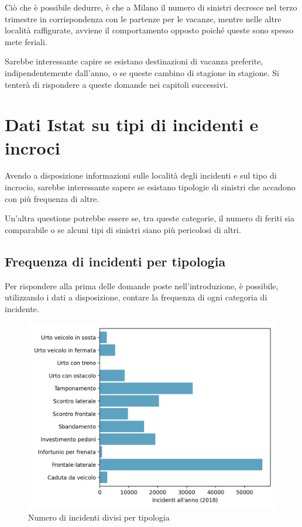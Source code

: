 \documentclass[a4paper,12pt]{report}
\begin{document}
Ciò che è possibile dedurre, è che a Milano il numero di sinistri decresce 
nel terzo trimestre in corrispondenza con le partenze per le vacanze, mentre nelle 
altre località raffigurate, avviene il comportamento opposto poiché 
queste sono spesso mete feriali. 

Sarebbe interessante capire se esistano destinazioni di vacanza preferite, 
indipendentemente dall'anno, o se queste cambino di stagione in stagione. 
Si tenterà di rispondere a queste domande nei capitoli successivi. 

\section{Dati Istat su tipi di incidenti e incroci}

Avendo a disposizione informazioni sulle località degli incidenti 
e sul tipo di incrocio, 
sarebbe interessante sapere se esistano tipologie di sinistri che accadono 
con più frequenza di altre. 

Un'altra questione potrebbe essere se, tra queste categorie, il numero di feriti 
sia comparabile o se alcuni tipi di sinistri siano più pericolosi di altri. 

\subsection{Frequenza di incidenti per tipologia }

Per rispondere alla prima delle domande poste nell'introduzione, è possibile, 
utilizzando i dati a disposizione, contare la frequenza di ogni categoria di incidente. 

\begin{figure}
    \hfill\includegraphics[width=0.7\linewidth]{../src/incidenti/incidenti_senza_coords/localizzazione_incidente/tipo_incidente.png}\hspace*{\fill}
    \caption{Numero di incidenti divisi per tipologia}
    \label{fig:tipo-incidente}
\end{figure}
\end{document}
